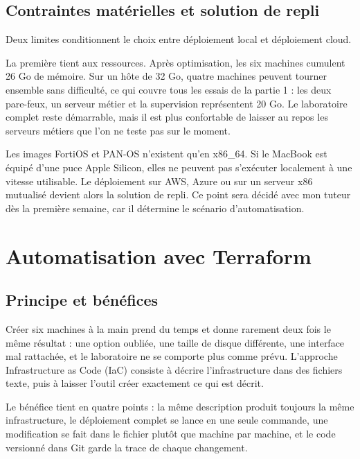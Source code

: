 \documentclass[11pt,a4paper]{article}
\begin{document}
\subsection{Contraintes matérielles et solution de repli}\label{sec:contraintes}
Deux limites conditionnent le choix entre déploiement local et déploiement cloud.

La première tient aux ressources. Après optimisation, les six machines cumulent 26 Go de mémoire. Sur un hôte de 32 Go, quatre machines peuvent tourner ensemble sans difficulté, ce qui couvre tous les essais de la partie 1 : les deux pare-feux, un serveur métier et la supervision représentent 20 Go. Le laboratoire complet reste démarrable, mais il est plus confortable de laisser au repos les serveurs métiers que l'on ne teste pas sur le moment.

\begin{alertbox}
Les images FortiOS et PAN-OS n'existent qu'en x86\_64. Si le MacBook est équipé d'une puce Apple Silicon, elles ne peuvent pas s'exécuter localement à une vitesse utilisable. Le déploiement sur AWS, Azure ou sur un serveur x86 mutualisé devient alors la solution de repli. Ce point sera décidé avec mon tuteur dès la première semaine, car il détermine le scénario d'automatisation.
\end{alertbox}

\section{Automatisation avec Terraform}

\subsection{Principe et bénéfices}
Créer six machines à la main prend du temps et donne rarement deux fois le même résultat : une option oubliée, une taille de disque différente, une interface mal rattachée, et le laboratoire ne se comporte plus comme prévu. L'approche Infrastructure as Code (IaC) consiste à décrire l'infrastructure dans des fichiers texte, puis à laisser l'outil créer exactement ce qui est décrit.

Le bénéfice tient en quatre points : la même description produit toujours la même infrastructure, le déploiement complet se lance en une seule commande, une modification se fait dans le fichier plutôt que machine par machine, et le code versionné dans Git garde la trace de chaque changement.
\end{document}
